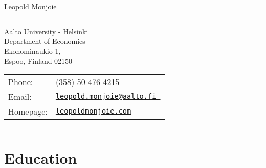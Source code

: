 \documentclass[letterpaper]{article}
\def\name{Leopold Monjoie}
\begin{document}
{\huge \name}

\vspace{0.1in}

\par\noindent\rule{\textwidth}{0.5pt}

\vspace{0.1in}


\begin{minipage}{0.45\linewidth}
  {Aalto University - Helsinki} \\
  Department of Economics \\
  Ekonominaukio 1,   \\
  Espoo, Finland 02150
\end{minipage}
\begin{minipage}{0.45\linewidth}
  \begin{tabular}{ll}
    Phone: & (358) 50 476 4215 \\
    Email: & \href{mailto:hotelling@unc.edu}{\tt leopold.monjoie@aalto.fi } \\
    Homepage: & \href{http://leopoldmonjoie.com/}{\tt leopoldmonjoie.com} \\
  \end{tabular}
\end{minipage}

\vspace{0.1in}

\par\noindent\rule{\textwidth}{0.5pt}

\section*{\textbf{Education}}
\end{document}
